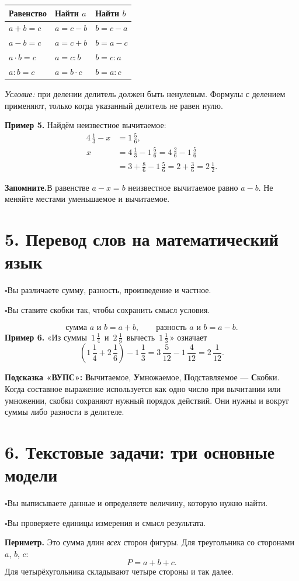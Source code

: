 \documentclass[a4paper,12pt]{article}
\newcommand{\sectionline}[1]{\section*{\color{darkaccent}#1}}
\newcommand{\learn}[1]{\par\noindent$\square$\enspace #1\par}
\newcommand{\keyidea}[1]{\par\noindent\textcolor{darkaccent}{\textbf{Запомните.}}\enspace #1\par}
\newcommand{\mix}[3]{#1\,\frac{#2}{#3}}
\begin{document}
\renewcommand{\arraystretch}{1.28}
\begin{center}
\begin{tabular}{@{}lll@{}}
\toprule
\textbf{Равенство} & \textbf{Найти $a$} & \textbf{Найти $b$}\\
\midrule
$a+b=c$ & $a=c-b$ & $b=c-a$\\
$a-b=c$ & $a=c+b$ & $b=a-c$\\
$a\cdot b=c$ & $a=c:b$ & $b=c:a$\\
$a:b=c$ & $a=b\cdot c$ & $b=a:c$\\
\bottomrule
\end{tabular}
\end{center}
\emph{Условие:} при делении делитель должен быть ненулевым.
Формулы с делением применяют, только когда указанный делитель не равен нулю.

\textbf{Пример 5.} Найдём неизвестное вычитаемое:
\begin{align*}
\mix{4}{1}{3}-x&=\mix{1}{5}{6},\\
x&=\mix{4}{1}{3}-\mix{1}{5}{6}
=\mix{4}{2}{6}-\mix{1}{5}{6}\\
&=3+\frac86-\mix{1}{5}{6}
=2+\frac36
=\boxed{\mix{2}{1}{2}}.
\end{align*}
\keyidea{В равенстве $a-x=b$ неизвестное вычитаемое равно $a-b$.
Не меняйте местами уменьшаемое и вычитаемое.}

\sectionline{5. Перевод слов на математический язык}
\learn{Вы различаете сумму, разность, произведение и частное.}
\learn{Вы ставите скобки так, чтобы сохранить смысл условия.}

\[
\text{сумма $a$ и $b$}=a+b,\qquad
\text{разность $a$ и $b$}=a-b.
\]
\textbf{Пример 6.} «Из суммы $\,\mix{1}{1}{4}\,$ и $\,\mix{2}{1}{6}\,$
вычесть $\,\mix{1}{1}{3}\,$» означает
\[
\left(\mix{1}{1}{4}+\mix{2}{1}{6}\right)-\mix{1}{1}{3}
=\mix{3}{5}{12}-\mix{1}{4}{12}
=\boxed{\mix{2}{1}{12}}.
\]

\textbf{Подсказка «ВУПС»:} \textbf{В}ычитаемое,
\textbf{У}множаемое, \textbf{П}одставляемое --- \textbf{С}кобки.
Когда составное выражение используется как одно число при вычитании
или умножении, скобки сохраняют нужный порядок действий.
Они нужны и вокруг суммы либо разности в делителе.

\sectionline{6. Текстовые задачи: три основные модели}
\learn{Вы выписываете данные и определяете величину, которую нужно найти.}
\learn{Вы проверяете единицы измерения и смысл результата.}

\textbf{Периметр.} Это сумма длин \emph{всех} сторон фигуры.
Для треугольника со сторонами $a$, $b$, $c$:
\[
P=a+b+c.
\]
Для четырёхугольника складывают четыре стороны и так далее.
\end{document}
